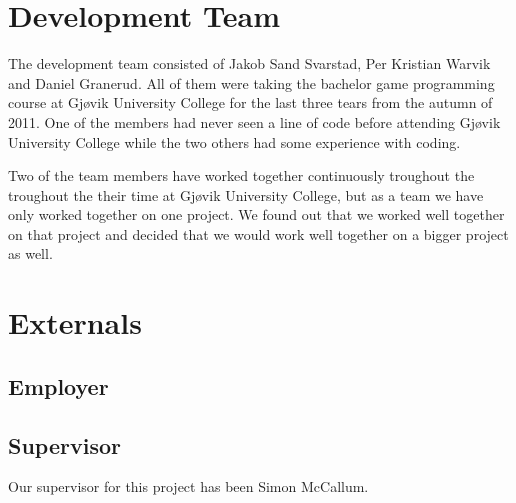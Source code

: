 \chapter{Development Team}
The development team consisted of Jakob Sand Svarstad, Per Kristian Warvik and Daniel Granerud.
All of them were taking the bachelor game programming course at Gj\o vik University College for the last three tears from the autumn of 2011. One of the members had never seen a line of code before attending Gj\o vik University College while the two others had some experience with coding.

Two of the team members have worked together continuously troughout the  troughout the their time at Gj\o vik University College, but as a team we have only worked together on one project. We found out that we worked well together on that project and decided that we would work well together on a bigger project as well.

\chapter{Externals}

\section{Employer}

\section{Supervisor}
Our supervisor for this project has been Simon McCallum.





